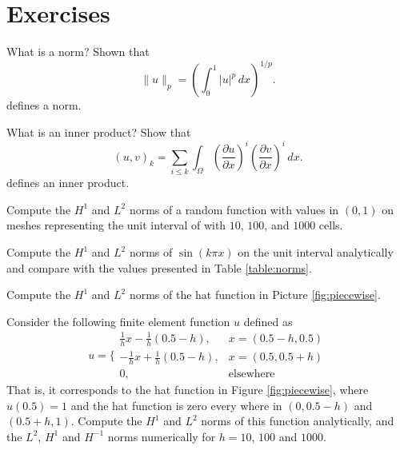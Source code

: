 \section{Exercises}

\begin{exercise}
What is a norm? Shown that 
\[
\|u\|_p = (\int_0^1 |u|^p \, dx)^{1/p} .    
\]
defines a norm. 

\end{exercise}

\begin{exercise}
What is an inner product? 
Show that 
\[
	(u, v)_{k} = \sum_{i \le k} \int_\Omega (\frac{\partial u}{\partial x})^i (\frac{\partial v}{\partial x})^i \,  dx.    
\]
defines an inner product. 

\end{exercise}

\begin{exercise}
Compute the $H^1$ and $L^2$ norms of a random function with values
in $(0,1)$ on meshes representing the unit interval of with $10$, $100$, and $1000$ cells.   
\end{exercise}

\begin{exercise}
Compute the $H^1$ and $L^2$ norms of  $\sin( k \pi x)$ on the unit interval analytically 
and compare with the values presented in Table \ref{table:norms}.   
\end{exercise}

\begin{exercise}
\label{ex:piecewise}
Compute the $H^1$ and $L^2$ norms of  the hat function in Picture \ref{fig:piecewise}.   
\end{exercise}



\begin{exercise}
\label{ex:hat2}
Consider the following finite element function $u$ defined
as  
\[
u = \Bigg\{ 
\begin{array}{ll} \frac{1}{h} x - \frac{1}{h} (0.5 - h), & x=(0.5-h,0.5) \\  
              -\frac{1}{h} x + \frac{1}{h} (0.5 - h),  & x=(0.5,0.5 + h) \\  
                0, & \mbox{elsewhere}  
\end{array}
\]
That is, it corresponds to the hat function in Figure \ref{fig:piecewise}, where
$u(0.5)=1$ and the hat function is zero every where in $(0,0.5-h)$ and  $(0.5+h, 1)$.  
Compute the $H^1$ and $L^2$ norms of this function analytically, and the 
$L^2$, $H^1$ and $H^{-1}$ norms numerically for $h=10$, $100$ and $1000$.    
\end{exercise}







